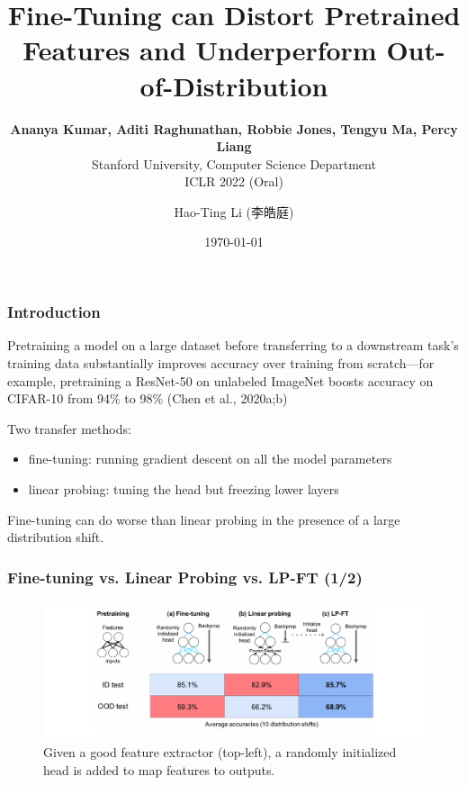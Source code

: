 \documentclass[16pt,aspectratio=169]{beamer}
\title{Fine-Tuning can Distort Pretrained Features and Underperform Out-of-Distribution}
\subtitle{
    \textbf{Ananya Kumar, Aditi Raghunathan, Robbie Jones, Tengyu Ma, Percy Liang}\\
    Stanford University, Computer Science Department\\
    ICLR 2022 (Oral)
}
\date{\today}
\author{Hao-Ting Li (李皓庭)}
\institute{}
\begin{document}

\maketitle

\begin{frame}
    \frametitle{Introduction}

    Pretraining a model on a large dataset before transferring to a downstream task's training data substantially improves accuracy over training from scratch—for example, pretraining a ResNet-50 on unlabeled ImageNet boosts accuracy on CIFAR-10 from 94\% to 98\% (Chen et al., 2020a;b)

    Two transfer methods:
    \begin{itemize}
        \item fine-tuning: running gradient descent on all the model parameters
        \item linear probing: tuning the head but freezing lower layers
    \end{itemize}

    Fine-tuning can do worse than linear probing in the presence of a large distribution shift.
\end{frame}

\begin{frame}
    \frametitle{Fine-tuning vs. Linear Probing vs. LP-FT (1/2)}

    \begin{figure}[htbp]
        \centering
        \includegraphics[width=\textwidth]{figures/illustration.png}
        \caption{Given a good feature extractor (top-left), a randomly initialized head is added to map features to outputs.}
    \end{figure}

\end{frame}
\end{document}
